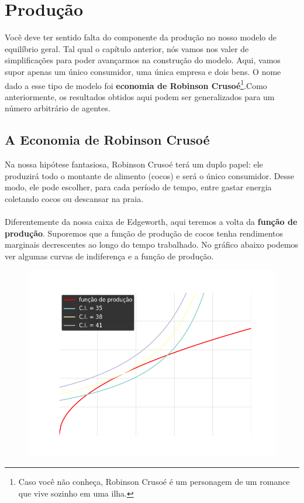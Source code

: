 \documentclass[a4paper,11pt,oneside]{book}
\theoremstyle{definition}
\theoremstyle{break}
\begin{document}
\chapter{Produção}

Você deve ter sentido falta do componente da produção no nosso modelo de equilíbrio geral. Tal qual o capítulo anterior, nós vamos nos valer de simplificações para poder avançarmos na construção do modelo. Aqui, vamos supor apenas um único consumidor, uma única empresa e dois bens. O nome dado a esse tipo de modelo foi \textbf{economia de Robinson Crusoé}\footnote{Caso você não conheça, Robinson Crusoé é um personagem de um romance que vive sozinho em uma ilha.}.Como anteriormente, os resultados obtidos aqui podem ser generalizados para um número arbitrário de agentes.

\section{A Economia de Robinson Crusoé}

Na nossa hipótese fantasiosa, Robinson Crusoé terá um duplo papel: ele produzirá todo o montante de alimento (cocos) e será o único consumidor. Desse modo, ele pode escolher, para cada período de tempo, entre gastar energia coletando cocos ou descansar na praia.
\\~\\
Diferentemente da nossa caixa de Edgeworth, aqui teremos a volta da \textbf{função de produção}. Suporemos que a função de produção de cocos tenha rendimentos marginais decrescentes ao longo do tempo trabalhado. No gráfico abaixo podemos ver algumas curvas de indiferença e a função de produção.

\begin{figure}[H]
	\centering
	\includegraphics[scale=0.6]{cap33_1-economia_robinson.png}
\end{figure}
\end{document}
